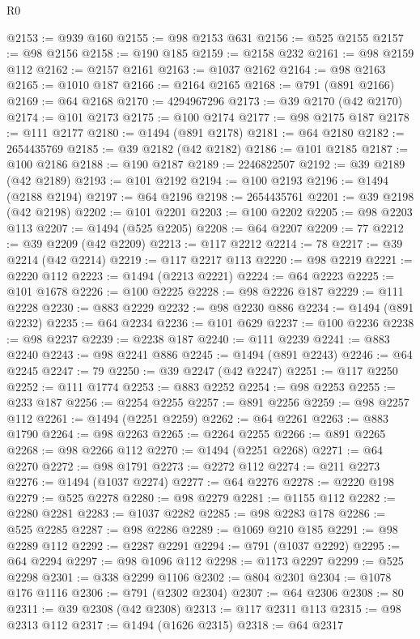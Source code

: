 \begin{lexlean}{R0}
\begin{coremodule}
@2153 := @939 @160
@2155 := @98 @2153 @631
@2156 := @525 @2155
@2157 := @98 @2156
@2158 := @190 @185
@2159 := @2158 @232
@2161 := @98 @2159 @112
@2162 := @2157 @2161
@2163 := @1037 @2162
@2164 := @98 @2163
@2165 := @1010 @187
@2166 := @2164 @2165
@2168 := @791 (@891 @2166)
@2169 := @64 @2168
@2170 := 4294967296
@2173 := @39 @2170 (@42 @2170)
@2174 := @101 @2173
@2175 := @100 @2174
@2177 := @98 @2175 @187
@2178 := @111 @2177
@2180 := @1494 (@891 @2178)
@2181 := @64 @2180
@2182 := 2654435769
@2185 := @39 @2182 (@42 @2182)
@2186 := @101 @2185
@2187 := @100 @2186
@2188 := @190 @2187
@2189 := 2246822507
@2192 := @39 @2189 (@42 @2189)
@2193 := @101 @2192
@2194 := @100 @2193
@2196 := @1494 (@2188 @2194)
@2197 := @64 @2196
@2198 := 2654435761
@2201 := @39 @2198 (@42 @2198)
@2202 := @101 @2201
@2203 := @100 @2202
@2205 := @98 @2203 @113
@2207 := @1494 (@525 @2205)
@2208 := @64 @2207
@2209 := 77
@2212 := @39 @2209 (@42 @2209)
@2213 := @117 @2212
@2214 := 78
@2217 := @39 @2214 (@42 @2214)
@2219 := @117 @2217 @113
@2220 := @98 @2219
@2221 := @2220 @112
@2223 := @1494 (@2213 @2221)
@2224 := @64 @2223
@2225 := @101 @1678
@2226 := @100 @2225
@2228 := @98 @2226 @187
@2229 := @111 @2228
@2230 := @883 @2229
@2232 := @98 @2230 @886
@2234 := @1494 (@891 @2232)
@2235 := @64 @2234
@2236 := @101 @629
@2237 := @100 @2236
@2238 := @98 @2237
@2239 := @2238 @187
@2240 := @111 @2239
@2241 := @883 @2240
@2243 := @98 @2241 @886
@2245 := @1494 (@891 @2243)
@2246 := @64 @2245
@2247 := 79
@2250 := @39 @2247 (@42 @2247)
@2251 := @117 @2250
@2252 := @111 @1774
@2253 := @883 @2252
@2254 := @98 @2253
@2255 := @233 @187
@2256 := @2254 @2255
@2257 := @891 @2256
@2259 := @98 @2257 @112
@2261 := @1494 (@2251 @2259)
@2262 := @64 @2261
@2263 := @883 @1790
@2264 := @98 @2263
@2265 := @2264 @2255
@2266 := @891 @2265
@2268 := @98 @2266 @112
@2270 := @1494 (@2251 @2268)
@2271 := @64 @2270
@2272 := @98 @1791
@2273 := @2272 @112
@2274 := @211 @2273
@2276 := @1494 (@1037 @2274)
@2277 := @64 @2276
@2278 := @2220 @198
@2279 := @525 @2278
@2280 := @98 @2279
@2281 := @1155 @112
@2282 := @2280 @2281
@2283 := @1037 @2282
@2285 := @98 @2283 @178
@2286 := @525 @2285
@2287 := @98 @2286
@2289 := @1069 @210 @185
@2291 := @98 @2289 @112
@2292 := @2287 @2291
@2294 := @791 (@1037 @2292)
@2295 := @64 @2294
@2297 := @98 @1096 @112
@2298 := @1173 @2297
@2299 := @525 @2298
@2301 := @338 @2299 @1106
@2302 := @804 @2301
@2304 := @1078 @176 @1116
@2306 := @791 (@2302 @2304)
@2307 := @64 @2306
@2308 := 80
@2311 := @39 @2308 (@42 @2308)
@2313 := @117 @2311 @113
@2315 := @98 @2313 @112
@2317 := @1494 (@1626 @2315)
@2318 := @64 @2317

\end{coremodule}
\end{lexlean}

